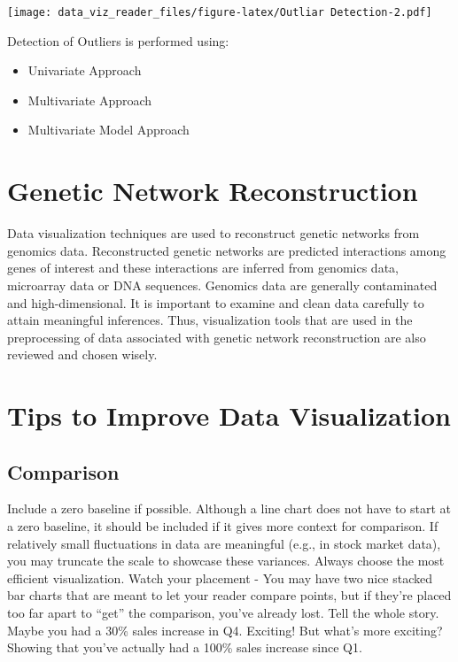 \documentclass[]{book}
\providecommand{\tightlist}{%
  \setlength{\itemsep}{0pt}\setlength{\parskip}{0pt}}
\theoremstyle{definition}
\theoremstyle{definition}
\theoremstyle{definition}
\theoremstyle{remark}
\begin{document}
\texttt{[image: data\_viz\_reader\_files/figure-latex/Outliar Detection-2.pdf]}

Detection of Outliers is performed using:

\begin{itemize}
\tightlist
\item
  Univariate Approach
\item
  Multivariate Approach
\item
  Multivariate Model Approach
\end{itemize}

\section{Genetic Network
Reconstruction}\label{genetic-network-reconstruction}

Data visualization techniques are used to reconstruct genetic networks
from genomics data. Reconstructed genetic networks are predicted
interactions among genes of interest and these interactions are inferred
from genomics data, microarray data or DNA sequences. Genomics data are
generally contaminated and high-dimensional. It is important to examine
and clean data carefully to attain meaningful inferences. Thus,
visualization tools that are used in the preprocessing of data
associated with genetic network reconstruction are also reviewed and
chosen wisely.

\section{Tips to Improve Data
Visualization}\label{tips-to-improve-data-visualization}

\subsection{Comparison}\label{comparison}

Include a zero baseline if possible. Although a line chart does not have
to start at a zero baseline, it should be included if it gives more
context for comparison. If relatively small fluctuations in data are
meaningful (e.g., in stock market data), you may truncate the scale to
showcase these variances. Always choose the most efficient
visualization. Watch your placement - You may have two nice stacked bar
charts that are meant to let your reader compare points, but if they're
placed too far apart to ``get'' the comparison, you've already lost.
Tell the whole story. Maybe you had a 30\% sales increase in Q4.
Exciting! But what's more exciting? Showing that you've actually had a
100\% sales increase since Q1.
\end{document}
